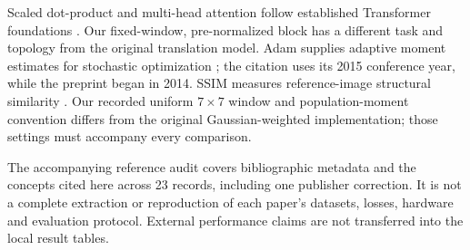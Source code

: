Scaled dot-product and multi-head attention follow established Transformer foundations \cite{vaswani2017attention}. Our fixed-window, pre-normalized block has a different task and topology from the original translation model. Adam supplies adaptive moment estimates for stochastic optimization \cite{kingma2015adam}; the citation uses its 2015 conference year, while the preprint began in 2014. SSIM measures reference-image structural similarity \cite{wang2004ssim}. Our recorded uniform $7\times7$ window and population-moment convention differs from the original Gaussian-weighted implementation; those settings must accompany every comparison.

The accompanying reference audit covers bibliographic metadata and the concepts cited here across 23 records, including one publisher correction. It is not a complete extraction or reproduction of each paper's datasets, losses, hardware and evaluation protocol. External performance claims are not transferred into the local result tables.

